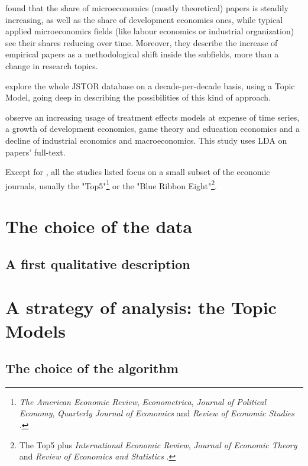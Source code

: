 \documentclass[a4paper, headings=standardclasses]{scrartcl}
\begin{document}
\textcite{angrist2017} found that the share of microeconomics (mostly theoretical) papers is steadily increasing, as well as the share of development economics ones, while typical applied microeconomics fields (like labour economics or industrial organization) see their shares reducing over time.
Moreover, they describe the increase of empirical papers as a methodological shift inside the subfields, more than a change in research topics.

\textcite{ambrosino2018} explore the whole JSTOR database on a decade-per-decade basis, using a Topic Model, going deep in describing the possibilities of this kind of approach.

\textcite{fontana2019} observe an increasing usage of treatment effects models at expense of time series, a growth of development economics, game theory and education economics and a decline of industrial economics and macroeconomics. This study uses LDA on papers' full-text.

Except for \textcite{ambrosino2018}, all the studies listed focus on a small subset of the economic journals, usually the "Top5"\footnote{\textit{The American Economic Review}, \textit{Econometrica}, \textit{Journal of Political Economy}, \textit{Quarterly Journal of Economics} and \textit{Review of Economic Studies} \parencite{heckman2020}.} or the "Blue Ribbon Eight"\footnote{The Top5 plus \textit{International Economic Review}, \textit{Journal of Economic Theory} and \textit{Review of Economics and Statistics} \parencite{dusansky1998}.}.

\section{The choice of the data}

\subsection{A first qualitative description}

\section{A strategy of analysis: the Topic Models}

\subsection{The choice of the algorithm}
\end{document}
